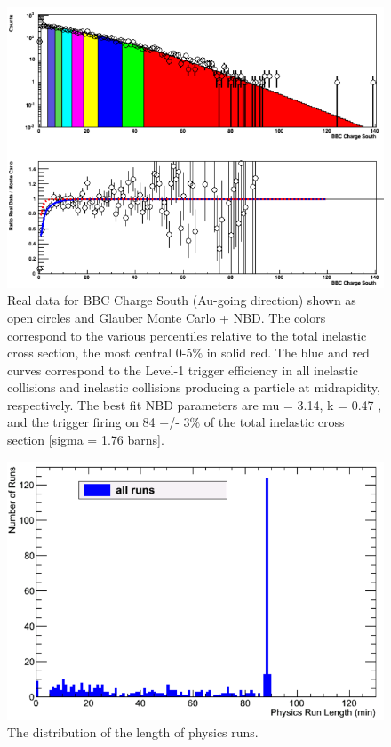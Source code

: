 \begin{figure}[!h]
\begin{center}
\includegraphics[width=0.65\linewidth]{figs/centrality_determination.png}
\caption{Real data for BBC Charge South (Au-going direction) shown as open circles and Glauber Monte Carlo + NBD. The colors correspond to the various
percentiles relative to the total inelastic \pau cross section, the most central 0-5$\%$ in solid red. The blue and red curves correspond to the Level-1 trigger
efficiency in all inelastic collisions and inelastic collisions producing a particle at midrapidity, respectively. The best fit NBD parameters are mu = 3.14, k = 0.47
, and the trigger firing on 84 +/- 3$\%$ of the total inelastic cross section [sigma = 1.76 barns].}
\end{center}
\end{figure}

\begin{figure}[!h]
\begin{center}
\includegraphics[width=0.65\linewidth]{figs/hruntime.png}
\caption{The distribution of the length of physics runs.}
\end{center}
\end{figure}

